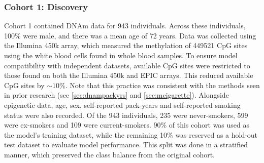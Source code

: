 \documentclass{article} %
\begin{document}
\subsubsection{Cohort 1: Discovery}
Cohort 1 contained DNAm data for 943 individuals. Across these individuals, 100\% were male, and there was a mean age of 72 years. Data was collected using the Illumina 450k array, which measured the methylation of \num{449521} CpG sites using the white blood cells found in whole blood samples. To ensure model compatibility with independent datasets, available CpG sites were restricted to those found on both the Illumina 450k and EPIC arrays. This reduced available CpG sites by \(\sim\!10\%\). Note that this practice was consistent with the methods seen in prior research (see \ref{sec:dnampackyrs} and \ref{sec:mcigarette}). Alongside epigenetic data, age, sex, self-reported pack-years and self-reported smoking status were also recorded. Of the 943 individuals, 235 were never-smokers, 599 were ex-smokers and 109 were current-smokers. 90\% of this cohort was used as the model's training dataset, while the remaining 10\% was reserved as a hold-out test dataset to evaluate model performance. This split was done in a stratified manner, which preserved the class balance from the original cohort.

\end{document}
